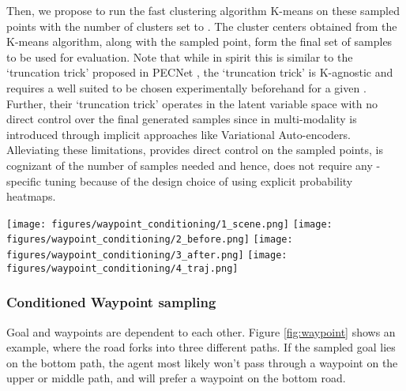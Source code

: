 \documentclass[final]{cvpr}
\begin{document}
Then, we propose to run the fast clustering algorithm K-means on these sampled points with the number of clusters set to . The cluster centers obtained from the K-means algorithm, along with the  sampled point,  form the final set of  samples to be used for evaluation. Note that while in spirit this is similar to the `truncation trick' proposed in PECNet \cite{mangalam2020not}, the `truncation trick' is K-agnostic  and requires a well suited  to be chosen experimentally beforehand for a given . Further, their `truncation trick' operates in the latent variable space with no direct control over the final generated samples since in \cite{mangalam2020not} multi-modality is introduced through implicit approaches like Variational Auto-encoders. Alleviating these limitations,  provides direct control on the sampled points, is cognizant of the number of samples needed  and hence, does not require any -specific tuning because of the design choice of using explicit probability heatmaps. 

\begin{figure*}[h!]
\centering
    \texttt{[image: figures/waypoint\_conditioning/1\_scene.png]}
    \texttt{[image: figures/waypoint\_conditioning/2\_before.png]}
    \texttt{[image: figures/waypoint\_conditioning/3\_after.png]}
    \texttt{[image: figures/waypoint\_conditioning/4\_traj.png]}
   \caption[short]{\textbf{Conditioned Waypoint sampling}: The first image shows the scene with the past trajectory in blue. The yellow star indicates the sampled goal. The unconditioned waypoint distribution can be seen in the second image; the distribution is goal-agnostic and therefore probability mass is distributed over all three roads. The third image is the resulting waypoint distribution, by multiplying the multivariate Gaussian prior with the unconditioned prediction. The final image shows the trajectory towards the sampled goal while crossing the waypoint.}
\label{fig:waypoint}
\end{figure*}

\subsubsection{Conditioned Waypoint sampling}
Goal and waypoints are dependent to each other. Figure \ref{fig:waypoint} shows an example, where the road forks into three different paths. If the sampled goal lies on the bottom path, the agent most likely won't pass through a waypoint on the upper or middle path, and will prefer a waypoint on the bottom road.
\end{document}
